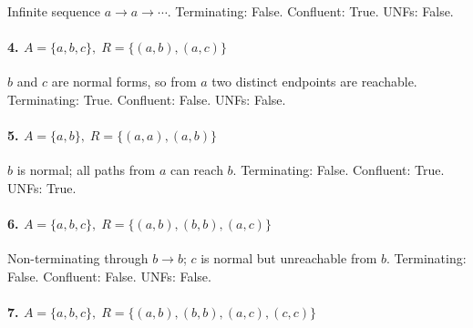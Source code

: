 \documentclass[11pt]{article}
\newcommand{\ARSnode}[1]{%
  \node[circle,draw,minimum size=7mm,inner sep=0pt] (#1) {$#1$};%
}
\newcommand{\ARSnodeat}[2]{%
  \node[circle,draw,minimum size=7mm,inner sep=0pt, #2] (#1) {$#1$};%
}
\begin{document}
Infinite sequence $a\to a\to\cdots$.  
Terminating: False. Confluent: True. UNFs: False.

\paragraph{4.\; $A=\{a,b,c\},\; R=\{(a,b),(a,c)\}$}

$b$ and $c$ are normal forms, so from $a$ two distinct endpoints are reachable.  
Terminating: True. Confluent: False. UNFs: False.

\paragraph{5.\; $A=\{a,b\},\; R=\{(a,a),(a,b)\}$}

$b$ is normal; all paths from $a$ can reach $b$.  
Terminating: False. Confluent: True. UNFs: True.

\paragraph{6.\; $A=\{a,b,c\},\; R=\{(a,b),(b,b),(a,c)\}$}

Non-terminating through $b\to b$; $c$ is normal but unreachable from $b$.  
Terminating: False. Confluent: False. UNFs: False.

\paragraph{7.\; $A=\{a,b,c\},\; R=\{(a,b),(b,b),(a,c),(c,c)\}$}
\end{document}
